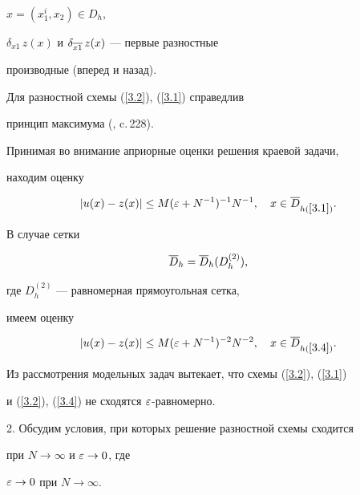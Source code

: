 $x=(x_1^i,x_2) \in D_h$, 


$\delta_{x1}\,z(x)$ и $\delta_{\overline{x1}}\,z(x)$ --- первые разностные


производные (вперед и назад).





Для разностной схемы (\ref{3.2}), (\ref{3.1}) справедлив


принцип максимума (\cite{5}, c.\,228).





Принимая во внимание априорные оценки решения краевой задачи,


находим оценку


\begin{equation} \label{3.3}


|u(x)-z(x)|\le M(\eps+N^{-1})^{-1}N^{-1},\quad 


x\in \Db_{h(\ref{3.1})}.


\end{equation}


В случае сетки


\begin{equation} \label{3.4}


\Dbh=\Dbh(D_h^{(2)}),


\end{equation}


где $D_h^{(2)}$ --- равномерная прямоугольная сетка,


имеем оценку


\begin{equation} \label{3.5}


|u(x)-z(x)|\le M(\eps+N^{-1})^{-2}N^{-2},\quad 


x\in \Db_{h(\ref{3.4})}.


\end{equation}


Из рассмотрения модельных задач вытекает, что схемы (\ref{3.2}), (\ref{3.1})


и (\ref{3.2}), (\ref{3.4}) не сходятся $\varepsilon$-равномерно.





2. Обсудим условия, при которых решение разностной схемы сходится


при $N\to\infty$ и $\varepsilon\to 0$, где


$\varepsilon\to 0$ при $N\to\infty$.





